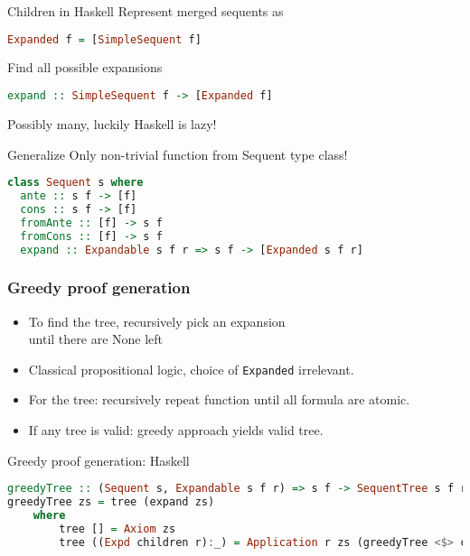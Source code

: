 \documentclass{beamer}
\begin{document}
\begin{frame}[fragile]{Children in Haskell}
	Represent merged sequents as

	\begin{lstlisting}[language=haskell]
Expanded f = [SimpleSequent f]
\end{lstlisting}

Find all possible expansions
\begin{lstlisting}[language=haskell]
expand :: SimpleSequent f -> [Expanded f]
\end{lstlisting}
\pause
Possibly many, luckily Haskell is lazy!

\end{frame}

\begin{frame}[fragile]{Generalize}
Only non-trivial function from Sequent type class!
\vspace{1em}
	    \begin{lstlisting}[language=Haskell]
class Sequent s where
  ante :: s f -> [f]
  cons :: s f -> [f]
  fromAnte :: [f] -> s f
  fromCons :: [f] -> s f
  expand :: Expandable s f r => s f -> [Expanded s f r]
    \end{lstlisting}

\end{frame}

\begin{frame}[fragile]
    \frametitle{Greedy proof generation}

    \begin{itemize}
    	\item To find the tree, recursively pick an expansion \\
      		until there are None left
		\item Classical propositional logic, choice of \texttt{Expanded} irrelevant.
		\item For the tree: recursively repeat function until all formula are atomic.
		\pause
		\item If any tree is valid: greedy approach yields valid tree.
    \end{itemize}
\end{frame}

\begin{frame}[fragile]{Greedy proof generation: Haskell}
    \begin{lstlisting}[language=Haskell]
greedyTree :: (Sequent s, Expandable s f r) => s f -> SequentTree s f r
greedyTree zs = tree (expand zs)
    where
        tree [] = Axiom zs
        tree ((Expd children r):_) = Application r zs (greedyTree <$> children)
    \end{lstlisting}

\end{frame}
\end{document}
